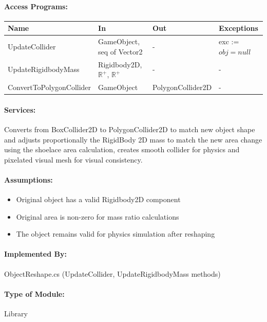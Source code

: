 \documentclass[12pt, titlepage]{article}
\begin{document}
\paragraph{Access Programs:}

\begin{center}
\begin{tabular}{p{48mm}p{26mm}p{35mm}p{32mm}}
\toprule
\textbf{Name} & \textbf{In} & \textbf{Out} & \textbf{Exceptions} \\
\midrule
UpdateCollider & GameObject, seq of Vector2 & - & exc := $obj = null$ \\
UpdateRigidbodyMass & Rigidbody2D, $\mathbb{R}^+$, $\mathbb{R}^+$ & - & - \\
ConvertToPolygonCollider & GameObject & PolygonCollider2D & - \\
\bottomrule
\end{tabular}
\end{center}

\paragraph{Services:}
Converts from BoxCollider2D to PolygonCollider2D to match new object shape and adjusts proportionally the RigidBody 2D mass to match the new area change using the shoelace area calculation, creates smooth collider for physics and pixelated visual mesh for visual consistency.

\paragraph{Assumptions:}
\begin{itemize}
\item Original object has a valid Rigidbody2D component
\item Original area is non-zero for mass ratio calculations
\item The object remains valid for physics simulation after reshaping
\end{itemize}

\paragraph{Implemented By:}
ObjectReshape.cs (UpdateCollider, UpdateRigidbodyMass methods)

\paragraph{Type of Module:}
Library
\end{document}
